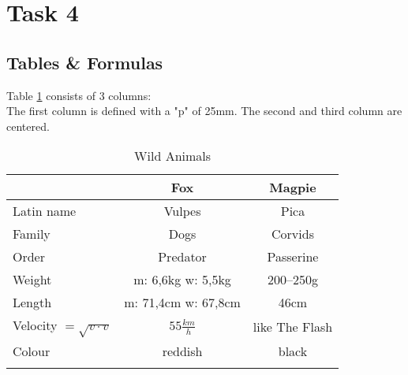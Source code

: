 \documentclass[a4paper, pdftex, english, 11pt]{article}
\begin{document}
\section{Task 4}
\subsection{Tables \& Formulas}
Table \ref{tab:ani} consists of 3 columns:\\
The first column is defined with a "p" of 25mm. The second and third column are centered.

\begin{longtable}{p{25mm}|c|c}
& Fox & Magpie\\
\hline
Latin name & Vulpes & Pica\\
\hline
Family & Dogs & Corvids\\
\hline
Order & Predator & Passerine\\
\hline
Weight & m: 6,6kg w: 5,5kg & 200--250g\\
\hline
Length  & m: 71,4cm w: 67,8cm & 46cm\\
\hline
Velocity $ = \sqrt{v\cdot v}$ & $55\frac{km}{h}$ & like The Flash \\
\hline
Colour & reddish & black\\
\hline
\caption{Wild Animals}
\label{tab:ani}
\end{longtable}
\end{document}
